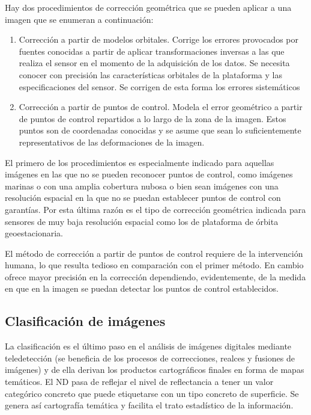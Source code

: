 Hay dos procedimientos de corrección geométrica que se pueden aplicar a una imagen que se enumeran a continuación:

\begin{enumerate}
	\item Corrección a partir de modelos orbitales. Corrige los errores provocados por fuentes conocidas a partir de aplicar transformaciones inversas a las que realiza el sensor en el momento de la adquisición de los datos. Se necesita conocer con precisión las características orbitales de la plataforma y las especificaciones del sensor. Se corrigen de esta forma los errores sistemáticos
	\item Corrección a partir de puntos de control. Modela el error geométrico a partir de puntos de control repartidos a lo largo de la zona de la imagen. Estos puntos son de coordenadas conocidas y se asume que sean lo suficientemente representativos de las deformaciones de la imagen.
\end{enumerate}

El primero de los procedimientos es especialmente indicado para aquellas imágenes en las que no se pueden reconocer puntos de control, como imágenes marinas o con una amplia cobertura nubosa o bien sean imágenes con una resolución espacial en la que no se puedan establecer puntos de control con garantías. Por esta última razón es el tipo de corrección geométrica indicada para sensores de muy baja resolución espacial como los de plataforma de órbita geoestacionaria.\Sep

El método de corrección a partir de puntos de control requiere de la intervención humana, lo que resulta tedioso en comparación con el primer método. En cambio ofrece mayor precisión en la corrección dependiendo, evidentemente, de la medida en que en la imagen se puedan detectar los puntos de control establecidos.\Sep

\subsection{Clasificación de imágenes}
La clasificación es el último paso en el análisis de imágenes digitales mediante teledetección (se beneficia de los procesos de correcciones, realces y fusiones de imágenes) y de ella derivan los productos cartográficos finales en forma de mapas temáticos. El \ac{ND} pasa de reflejar el nivel de reflectancia a tener un valor categórico concreto que puede etiquetarse con un tipo concreto de superficie. Se genera así cartografía temática y facilita el trato estadístico de la información.\Sep

